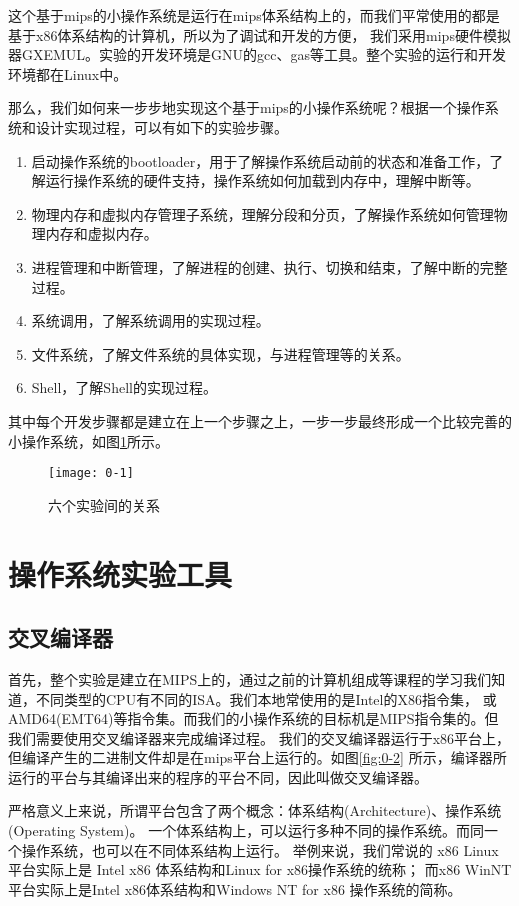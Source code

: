 这个基于mips的小操作系统是运行在mips体系结构上的，而我们平常使用的都是基于x86体系结构的计算机，所以为了调试和开发的方便，
我们采用mips硬件模拟器GXEMUL。实验的开发环境是GNU的gcc、gas等工具。整个实验的运行和开发环境都在Linux中。

那么，我们如何来一步步地实现这个基于mips的小操作系统呢？根据一个操作系统和设计实现过程，可以有如下的实验步骤。
\begin{enumerate}
  \item 启动操作系统的bootloader，用于了解操作系统启动前的状态和准备工作，了解运行操作系统的硬件支持，操作系统如何加载到内存中，理解中断等。
  \item 物理内存和虚拟内存管理子系统，理解分段和分页，了解操作系统如何管理物理内存和虚拟内存。
  \item 进程管理和中断管理，了解进程的创建、执行、切换和结束，了解中断的完整过程。
  \item 系统调用，了解系统调用的实现过程。
  \item 文件系统，了解文件系统的具体实现，与进程管理等的关系。
  \item Shell，了解Shell的实现过程。
\end{enumerate}
其中每个开发步骤都是建立在上一个步骤之上，一步一步最终形成一个比较完善的小操作系统，如图\ref{fig:0-1}所示。

\begin{figure}[htbp]
  \centering
  \texttt{[image: 0-1]}
  \caption{六个实验间的关系}\label{fig:0-1}
\end{figure}

\section{操作系统实验工具}

\subsection{交叉编译器}
首先，整个实验是建立在MIPS上的，通过之前的计算机组成等课程的学习我们知道，不同类型的CPU有不同的ISA。我们本地常使用的是Intel的X86指令集，
或AMD64(EMT64)等指令集。而我们的小操作系统的目标机是MIPS指令集的。但我们需要使用交叉编译器来完成编译过程。
我们的交叉编译器运行于x86平台上，但编译产生的二进制文件却是在mips平台上运行的。如图\ref{fig:0-2}
所示，编译器所运行的平台与其编译出来的程序的平台不同，因此叫做交叉编译器。

\begin{note}
严格意义上来说，所谓平台包含了两个概念：体系结构(Architecture)、操作系统(Operating System)。
一个体系结构上，可以运行多种不同的操作系统。而同一个操作系统，也可以在不同体系结构上运行。
举例来说，我们常说的 x86 Linux 平台实际上是 Intel x86 体系结构和Linux for x86操作系统的统称；
而x86 WinNT平台实际上是Intel x86体系结构和Windows NT for x86 操作系统的简称。
\end{note}

